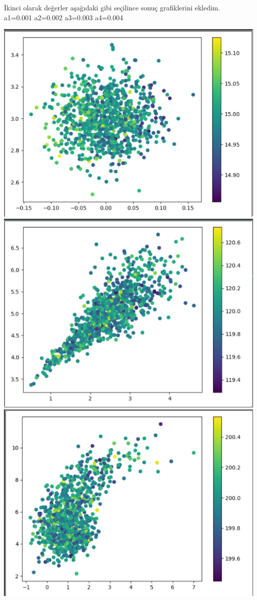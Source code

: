 \documentclass{article}
\begin{document}
		İkinci olarak değerler aşağıdaki gibi seçilince sonuç grafiklerini ekledim.\\
	a1=0.001 a2=0.002 a3=0.003 a4=0.004
		\begin{center}
		\includegraphics[scale=0.4]{step4}
		\includegraphics[scale=0.4]{step5}
		\includegraphics[scale=0.4]{step6}

\end{center}
\end{document}
